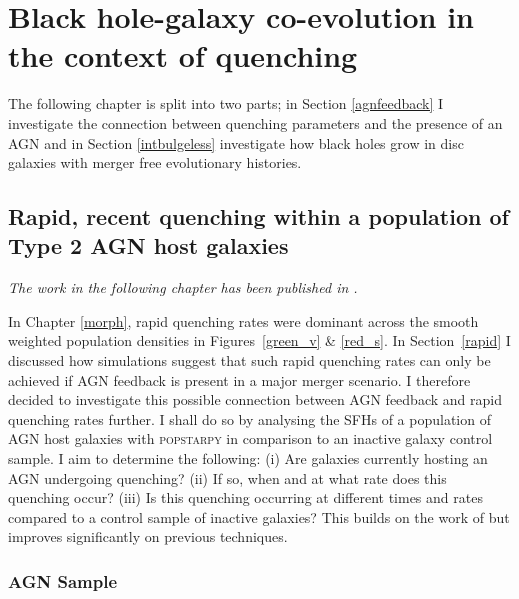 
\chapter{Black hole-galaxy co-evolution in the context of quenching}\label{chap:agn}

The following chapter is split into two parts; in Section \ref{agnfeedback} I investigate the connection between quenching parameters and the presence of an AGN and in Section \ref{intbulgeless} investigate how black holes grow in disc galaxies with merger free evolutionary histories. 

\section{Rapid, recent quenching within a population of Type 2 AGN host galaxies}\label{sec:agnfeedback}

\emph{The work in the following chapter has been published in \citet{smethurst16}.}

In Chapter \ref{morph}, rapid quenching rates were dominant across the smooth weighted population densities in Figures~\ref{green_v} \& \ref{red_s}. In Section~\ref{rapid} I discussed how simulations suggest that such rapid quenching rates can only be achieved if AGN feedback is present in a major merger scenario. I therefore decided to investigate this possible connection between AGN feedback and rapid quenching rates further. I shall do so by analysing the SFHs of a population of AGN host galaxies with \textsc{popstarpy} in comparison to an inactive galaxy control sample. I  aim to determine the following: (i) Are galaxies currently hosting an AGN undergoing quenching? (ii) If so, when and at what rate does this quenching occur? (iii) Is this quenching occurring at different times and rates compared to a control sample of inactive galaxies? This builds on the work of \citet{Martin07} but improves significantly on previous techniques.

\subsection{AGN Sample}\label{agnsample}

